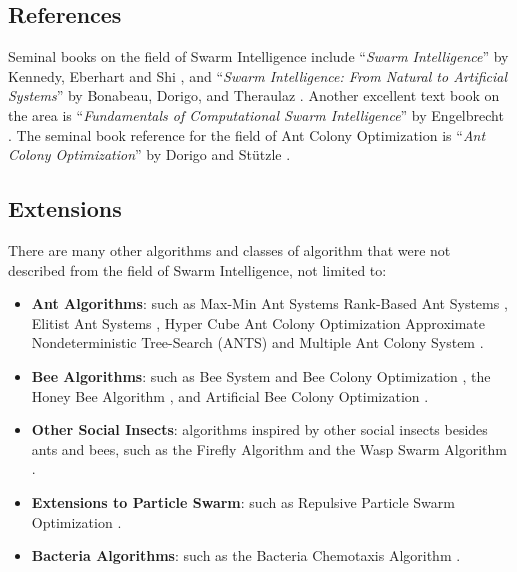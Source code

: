 \begin{bibunit}
\subsection{References}
Seminal books on the field of Swarm Intelligence include ``\emph{Swarm Intelligence}'' by Kennedy, Eberhart and Shi \cite{Kennedy2001}, and ``\emph{Swarm Intelligence: From Natural to Artificial Systems}'' by Bonabeau, Dorigo, and Theraulaz \cite{Bonabeau1999}. Another excellent text book on the area is ``\emph{Fundamentals of Computational Swarm Intelligence}'' by Engelbrecht \cite{Engelbrecht2006}. The seminal book reference for the field of Ant Colony Optimization is ``\emph{Ant Colony Optimization}'' by Dorigo and St\"utzle \cite{Dorigo2004}.

%
%
\subsection{Extensions}
There are many other algorithms and classes of algorithm that were not described from the field of Swarm Intelligence, not limited to:

\begin{itemize}
	\item \textbf{Ant Algorithms}: such as Max-Min Ant Systems \cite{Stutzle2000} Rank-Based Ant Systems \cite{Bullnheimer1999}, Elitist Ant Systems \cite{Dorigo1996}, Hyper Cube Ant Colony Optimization \cite{Blum2001} Approximate Nondeterministic Tree-Search (ANTS) \cite{Maniezzo1999} and Multiple Ant Colony System \cite{Gambardella1999}.
	\item \textbf{Bee Algorithms}: such as Bee System and Bee Colony Optimization \cite{Lucic2001}, the Honey Bee Algorithm \cite{Tovey2004}, and Artificial Bee Colony Optimization \cite{Karaboga2005, Basturk2006}.
	\item \textbf{Other Social Insects}: algorithms inspired by other social insects besides ants and bees, such as the Fireﬂy Algorithm \cite{Yang2008} and the Wasp Swarm Algorithm \cite{Pinto2007}.
	\item \textbf{Extensions to Particle Swarm}: such as Repulsive Particle Swarm Optimization \cite{Urfalioglu2004}.
	\item \textbf{Bacteria Algorithms}: such as the Bacteria Chemotaxis Algorithm \cite{Muller2002}.
\end{itemize}

\putbib
\end{bibunit}


\newpage\begin{bibunit}\putbib\end{bibunit}
\newpage\begin{bibunit}\putbib\end{bibunit}
\newpage\begin{bibunit}\putbib\end{bibunit}
\newpage\begin{bibunit}\putbib\end{bibunit}
\newpage\begin{bibunit}\putbib\end{bibunit}
